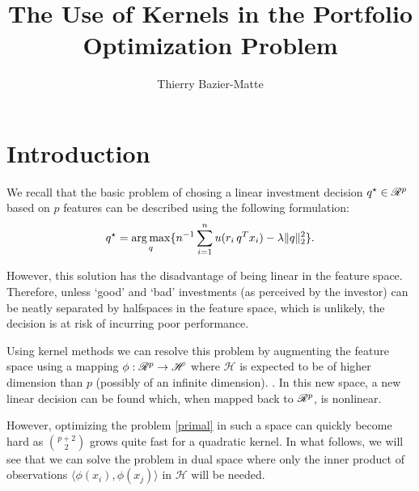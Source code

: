 \documentclass{article}
\title{The Use of Kernels in the Portfolio Optimization Problem}
\author{Thierry Bazier-Matte}
\begin{document}
\maketitle

\section{Introduction}


We recall that the basic problem of chosing a linear investment decision
$q^\star\in\mathscr{R}^p$ based on $p$ features can be described using the following
formulation:
\begin{equation}
  \label{primal}
  q^\star = \operatorname*{arg\,max}_q\{ n^{-1} \sum_{i=1}^n u(r_i\,q^Tx_i) - \lambda\|q\|^2_2\}.
\end{equation}

However, this solution has the disadvantage of being linear in the feature
space. Therefore, unless `good' and `bad' investments (as perceived by the investor) can
be neatly separated by halfspaces in the feature space, which is unlikely, the decision is
at risk of incurring poor performance.

Using kernel methods we can resolve this problem by augmenting the feature space using a
mapping $\phi:\mathscr{R}^p\to\mathscr{H}$ where $\mathscr{H}$ is expected to be of higher
dimension than $p$ (possibly of an infinite dimension). . In this new space, a new linear decision can be found
which, when mapped back to $\mathscr{R}^p$, is nonlinear. 

However, optimizing the problem \eqref{primal} in such a space can quickly become hard as
$\binom{p+2}{2}$ grows quite fast for a quadratic kernel. In what follows, we will see
that we can solve the problem in dual space where only the inner product of observations
$\langle \phi(x_i),\phi(x_j)\rangle$ in $\mathscr{H}$ will be needed.
\end{document}
